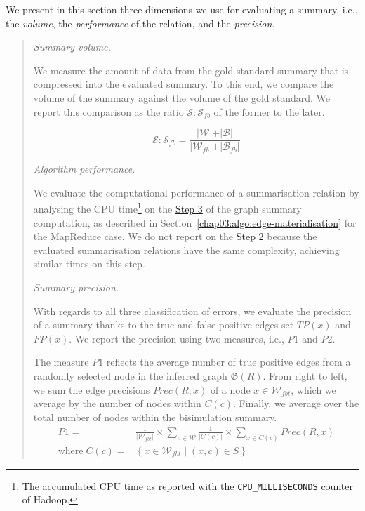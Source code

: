 We present in this section three dimensions we use for evaluating a summary, i.e., the \emph{volume}, the \emph{performance} of the relation, and the \emph{precision}.

\begin{quotation}
\item[\emph{Summary volume.}]

We measure the amount of data from the gold standard summary that is compressed into the evaluated summary. To this end, we compare the volume of the summary against the volume of the gold standard. We report this comparison as the ratio  $\mathcal{S}:\mathcal{S}_{fb}$ of the former to the later.

$$
\mathcal{S}:\mathcal{S}_{fb} = \frac{\vert \mathcal{W} \vert + \vert \mathcal{B} \vert}{\vert \mathcal{W}_{fb} \vert + \vert \mathcal{B}_{fb} \vert}
$$

\item[\emph{Algorithm performance.}]

We evaluate the computational performance of a summarisation relation by analysing the CPU time\footnote{The accumulated CPU time as reported with the \texttt{CPU\_MILLISECONDS} counter of Hadoop.} on the \hyperref[step-he]{Step 3} of the graph summary computation, as described in Section~\ref{chap03:algo:edge-materialisation} for the MapReduce case. We do not report on the \hyperref[step-hn]{Step 2} because the evaluated summarisation relations have the same complexity, achieving similar times on this step.

\item[\emph{Summary precision.}]

With regards to all three classification of errors, we evaluate the precision of a summary thanks to the true and false positive edges set $TP(x)$ and $FP(x)$.
We report the precision using two measures, i.e., $P1$ and $P2$.

The measure $P1$ reflects the average number of true positive edges from a randomly selected node in the inferred graph $\mathfrak{G}(R)$. From right to left, we sum the edge precisions $Prec(R, x)$ of a node $x\in \mathcal{W}_{fbt}$, which we average by the number of nodes within $C(c)$. Finally, we average over the total number of nodes within the bisimulation summary.
$$
\begin{aligned}
P1 = & \frac{1}{\vert \mathcal{W}_{fbt} \vert} \times \sum_{c \in \mathcal{W}}{\frac{1}{\vert C(c) \vert} \times \sum_{x \in C(c)}{Prec(R, x)}} \\
\text{where}\; C(c) = & \left\lbrace x \in \mathcal{W}_{fbt} \mid (x, c) \in S \right\rbrace
\end{aligned}
$$


\end{quotation}
